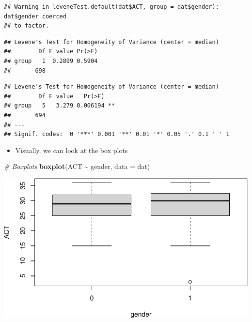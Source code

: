 \documentclass[
]{book}
\newenvironment{Shaded}{\begin{snugshade}}{\end{snugshade}}
\newcommand{\AttributeTok}[1]{\textcolor[rgb]{0.13,0.29,0.53}{#1}}
\newcommand{\CommentTok}[1]{\textcolor[rgb]{0.56,0.35,0.01}{\textit{#1}}}
\newcommand{\FunctionTok}[1]{\textcolor[rgb]{0.13,0.29,0.53}{\textbf{#1}}}
\newcommand{\NormalTok}[1]{#1}
\newcommand{\SpecialCharTok}[1]{\textcolor[rgb]{0.81,0.36,0.00}{\textbf{#1}}}
\providecommand{\tightlist}{%
  \setlength{\itemsep}{0pt}\setlength{\parskip}{0pt}}
\begin{document}
\begin{Shaded}
\end{Shaded}

\begin{verbatim}
## Warning in leveneTest.default(dat$ACT, group = dat$gender): dat$gender coerced
## to factor.
\end{verbatim}

\begin{verbatim}
## Levene's Test for Homogeneity of Variance (center = median)
##        Df F value Pr(>F)
## group   1  0.2899 0.5904
##       698
\end{verbatim}

\begin{Shaded}
\end{Shaded}

\begin{verbatim}
## Levene's Test for Homogeneity of Variance (center = median)
##        Df F value   Pr(>F)   
## group   5   3.279 0.006194 **
##       694                    
## ---
## Signif. codes:  0 '***' 0.001 '**' 0.01 '*' 0.05 '.' 0.1 ' ' 1
\end{verbatim}

\begin{itemize}
\tightlist
\item
  Visually, we can look at the box plots
\end{itemize}

\begin{Shaded}
\begin{Highlighting}[]
\CommentTok{\# Boxplots}
\FunctionTok{boxplot}\NormalTok{(ACT }\SpecialCharTok{\textasciitilde{}}\NormalTok{ gender, }\AttributeTok{data =}\NormalTok{ dat)}
\end{Highlighting}
\end{Shaded}

\includegraphics{PSY202A-Modeling-I.Heo_files/figure-latex/unnamed-chunk-94-1.pdf}
\end{document}
